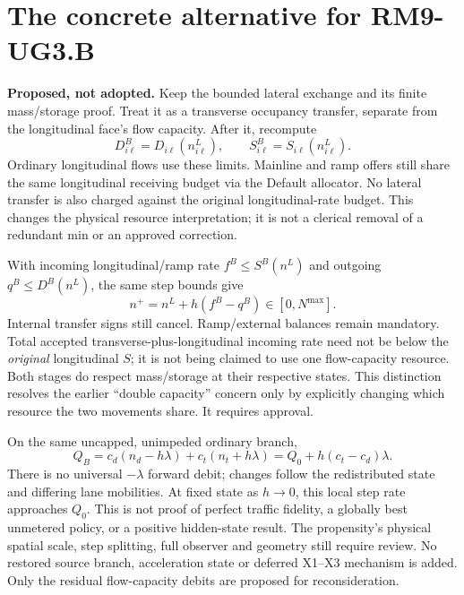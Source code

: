 \documentclass[10pt,a4paper]{article}
\begin{document}
\section{The concrete alternative for RM9-UG3.B}
\noindent\textbf{Proposed, not adopted.} Keep the bounded lateral exchange and
its finite mass/storage proof. Treat it as a transverse occupancy transfer,
separate from the longitudinal face's flow capacity. After it, recompute
\begin{equation}
 D^B_{i\ell}=D_{i\ell}(n^L_{i\ell}),\qquad
 S^B_{i\ell}=S_{i\ell}(n^L_{i\ell}).\label{eq:B}
\end{equation}
Ordinary longitudinal flows use these limits. Mainline and ramp offers still
share the same longitudinal receiving budget via the Default allocator.
No lateral transfer is also charged against the original longitudinal-rate
budget. This changes the physical resource interpretation; it is not a clerical
removal of a redundant min or an approved correction.

With incoming longitudinal/ramp rate $f^B\leq S^B(n^L)$ and outgoing
$q^B\leq D^B(n^L)$, the same step bounds give
\begin{equation}
 n^+=n^L+h(f^B-q^B)\in[0,N^{\max}].
\end{equation}
Internal transfer signs still cancel. Ramp/external balances remain mandatory.
Total accepted transverse-plus-longitudinal incoming rate need not be below the
\emph{original} longitudinal $S$; it is not being claimed to use one flow-capacity
resource. Both stages do respect mass/storage at their respective states.
This distinction resolves the earlier ``double capacity'' concern only by
explicitly changing which resource the two movements share. It requires approval.

On the same uncapped, unimpeded ordinary branch,
\begin{equation}
 Q_B=c_d(n_d-h\lambda)+c_t(n_t+h\lambda)
     =Q_0+h(c_t-c_d)\lambda.
\end{equation}
There is no universal $-\lambda$ forward debit; changes follow the redistributed
state and differing lane mobilities. At fixed state as $h\to0$, this local step
rate approaches $Q_0$. This is not proof of perfect traffic fidelity, a globally
best unmetered policy, or a positive hidden-state result. The propensity's physical
spatial scale, step splitting, full observer and geometry still require review.
No restored source branch, acceleration state or deferred X1--X3 mechanism is
added. Only the residual flow-capacity debits are proposed for reconsideration.
\end{document}
